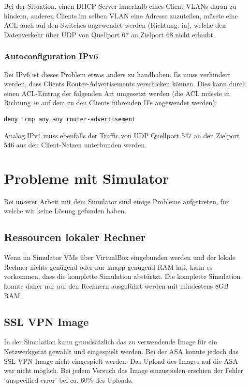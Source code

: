 \documentclass[11pt,a4paper,parskip=half]{scrartcl}
\begin{document}
Bei der Situation, einen DHCP-Server innerhalb eines Client VLANs daran zu hindern, anderen Clients im selben VLAN eine Adresse zuzuteilen, müsste eine ACL auch auf den Switches angewendet werden (Richtung: in), welche den Datenverkehr über UDP von Quellport 67 an Zielport 68 nicht erlaubt.

\subsubsection{Autoconfiguration IPv6}
Bei IPv6 ist dieses Problem etwas anders zu handhaben. Es muss verhindert werden, dass Clients Router-Advertisements verschicken können. Dies kann durch einen ACL-Eintrag der folgenden Art umgesetzt werden (die ACL müsste in Richtung \emph{in} auf dem zu den Clients führenden IFs angewendet werden):

\begin{lstlisting}
deny icmp any any router-advertisement
\end{lstlisting}

Analog IPv4 muss ebenfalls der Traffic von UDP Quellport 547 an den Zielport 546 aus den Client-Netzen unterbunden werden.

\section{Probleme mit Simulator}
Bei unserer Arbeit mit dem Simulator sind einige Probleme aufgetreten, für welche wir keine Lösung gefunden haben.

\subsection{Ressourcen lokaler Rechner}
Wenn im Simulator VMs über VirtualBox eingebunden werden und der lokale Rechner nichts genügend oder nur knapp genügend RAM hat, kann es vorkommen, dass  die komplette Simulation abstürtzt. Die komplette Simulation konnte daher nur auf den Rechnern ausgeführt werden mit mindestens 8GB RAM.
\subsection{SSL VPN Image}
In der Simulation kann grundsätzlich das zu verwendende Image für ein Netzwerkgerät gewählt und eingespielt werden. Bei der ASA konnte jedoch das SSL VPN Image nicht eingespielt werden. Das Upload des Images auf die ASA war nicht möglich. Bei jedem Versuch das Image einzuspielen erschien der Fehler 'unspecified error' bei ca. 60\% des Uploads.
\end{document}
